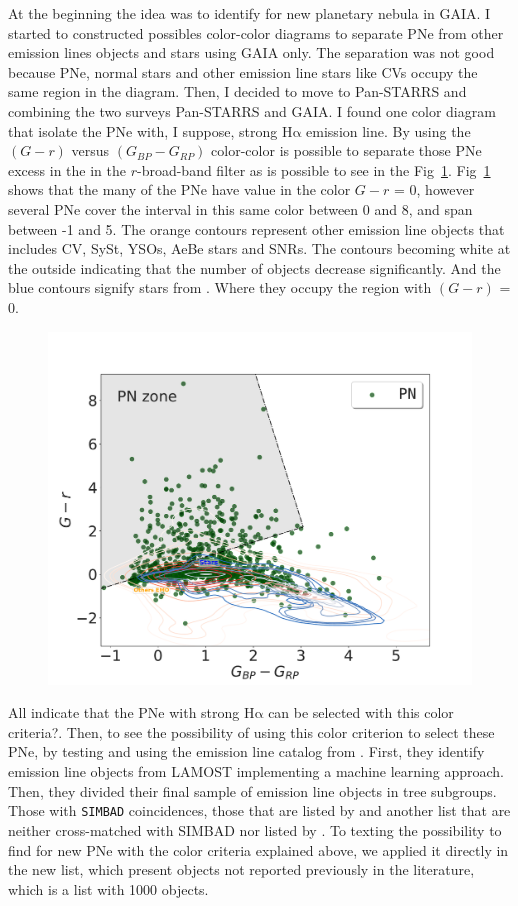 \documentclass[twocolumn]{article}
\newcommand\ha{\ensuremath{\mathrm{H\alpha}}}
\begin{document}
At the beginning the idea was to identify for new planetary nebula in GAIA.
I started to constructed possibles color-color diagrams to separate PNe from
other emission lines objects and stars using GAIA only. The separation was not
good because PNe, normal stars and other emission line stars like CVs occupy the same region
in the diagram. Then, I decided to move to Pan-STARRS and combining the two
surveys Pan-STARRS and GAIA. I found one color diagram that isolate the PNe
with, I suppose, strong \ha{} emission line. By using the \((G - r)\) versus \((G_{BP} - G_{RP})\)
color-color is possible to separate those PNe excess in the in the $r$-broad-band
filter as is possible to see in the Fig~\ref{fig:gaia-ps}. Fig~\ref{fig:gaia-ps}
shows that the many of the PNe have value in the color \(G - r\) = 0, however several
PNe cover the interval in this same color between 0 and 8, and span between -1 and 5.
The orange contours represent other emission line objects that includes CV, SySt,
YSOs, AeBe stars and SNRs. The contours becoming white at the outside indicating
that the number of objects decrease significantly. And the blue contours signify
stars from \citet{Smart:2021}. Where they occupy the region with \((G - r)\) = 0.

\begin{figure}
\centering
  \includegraphics[width=0.9\linewidth]{../Figs/color-diagram-ps-gaiaEDR3.pdf}
  \caption{} 
  \label{fig:gaia-ps}
\end{figure}

All indicate that the PNe with strong \ha{} can be selected with this color criteria?.
Then, to see the possibility of using this color criterion to select these PNe, by
testing and using the emission line catalog from  \citet{Skoda:2020}. First, they
identify emission line objects from LAMOST  implementing a machine learning approach.
Then, they divided their final sample of emission line objects in tree subgroups. Those with \texttt{SIMBAD} coincidences, those that are listed by \citet{Hou:2016} and another list that are neither cross-matched with SIMBAD nor listed by  \citet{Hou:2016}. To texting the possibility to find for new PNe with the color criteria
explained above, we applied it directly in the new list, which present objects not reported
previously in the literature, which is a list with 1000 objects.
\end{document}
